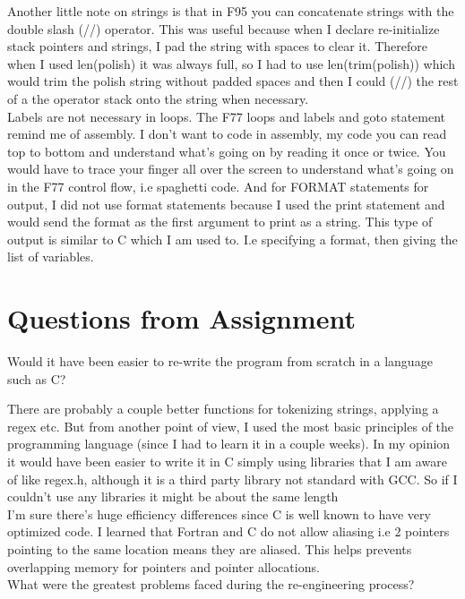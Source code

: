 \documentclass[a4paper,12pt]{article}
\begin{document}
\hspace{10 mm} Another little note on strings is that in F95 you can concatenate strings with the double slash (//) operator. This was useful because when I declare re-initialize stack pointers and strings, I pad the string with spaces to clear it. Therefore when I used len(polish) it was always full, so I had to use len(trim(polish)) which would trim the polish string without padded spaces and then I could (//) the rest of a the operator stack onto the string when necessary.\\
\hspace{10 mm}	Labels are not necessary in loops. The F77 loops and labels and goto statement remind me of assembly. I don't want to code in assembly, my code you can read top to bottom and understand what's going on by reading it once or twice. You would have to trace your finger all over the screen to understand what's going on in the F77 control flow, i.e spaghetti code. And for FORMAT statements for output, I did not use format statements because I used the print statement and would send the format as the first argument to print as a string. This type of output  is similar to C which I am used to. I.e specifying a format, then giving the list of variables.\\
	
\section{Questions from Assignment}
Would it have been easier to re-write the program from scratch in a language such as C?\vspace{.5cm}

\hspace{10 mm} There are probably a couple better functions for tokenizing strings, applying a regex etc. But from another point of view, I used the most basic principles of the programming language (since I had to learn it in a couple weeks). In my opinion it would have been easier to write it in C simply using libraries that I am aware of like regex.h, although it is a third party library not standard with GCC. So if I couldn't use any libraries it might be about the same length \\
\hspace{10 mm} I'm sure there's huge efficiency differences since C is well known to have very optimized code. I learned that Fortran and C do not allow aliasing i.e 2 pointers pointing to the same location means they are aliased. This helps prevents overlapping memory for pointers and pointer allocations.\\
What were the greatest problems faced during the re-engineering process?
\vspace{.5cm}
\end{document}
